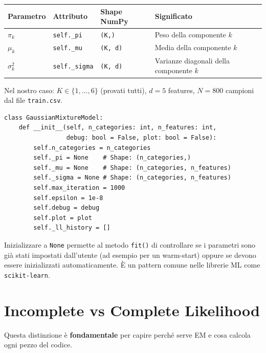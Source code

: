 \documentclass[11pt,a4paper]{article}
\begin{document}
\begin{center}
\begin{tabular}{llll}
\toprule
\textbf{Parametro} & \textbf{Attributo} & \textbf{Shape NumPy} &
\textbf{Significato} \\
\midrule
$\pi_k$ & \texttt{self.\_pi} & \texttt{(K,)} &
Peso della componente $k$ \\
$\mu_k$ & \texttt{self.\_mu} & \texttt{(K, d)} &
Media della componente $k$ \\
$\sigma_k^2$ & \texttt{self.\_sigma} & \texttt{(K, d)} &
Varianze diagonali della componente $k$ \\
\bottomrule
\end{tabular}
\end{center}

Nel nostro caso: $K \in \{1,\ldots,6\}$ (provati tutti), $d=5$ features,
$N=800$ campioni dal file \texttt{train.csv}.

\begin{lstlisting}[caption={Costruttore della classe}]
class GaussianMixtureModel:
    def __init__(self, n_categories: int, n_features: int,
                 debug: bool = False, plot: bool = False):
        self.n_categories = n_categories
        self._pi = None    # Shape: (n_categories,)
        self._mu = None    # Shape: (n_categories, n_features)
        self._sigma = None # Shape: (n_categories, n_features)
        self.max_iteration = 1000
        self.epsilon = 1e-8
        self.debug = debug
        self.plot = plot
        self._ll_history = []
\end{lstlisting}

\begin{infobox}
Inizializzare a \texttt{None} permette al metodo \texttt{fit()} di
controllare se i parametri sono già stati impostati dall'utente
(ad esempio per un warm-start) oppure se devono essere inizializzati
automaticamente. È un pattern comune nelle librerie ML come
\texttt{scikit-learn}.
\end{infobox}

\section{Incomplete vs Complete Likelihood}\label{sec:likelihood}

Questa distinzione è \textbf{fondamentale} per capire perché serve EM e
cosa calcola ogni pezzo del codice.
\end{document}
